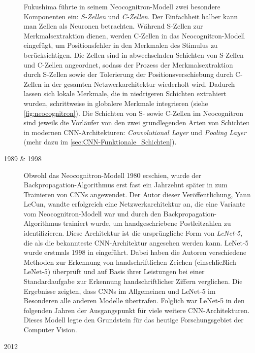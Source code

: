 \begin{description}
	Fukushima führte in seinem Neocognitron-Modell zwei besondere Komponenten ein: \emph{S-Zellen} und \emph{C-Zellen}. Der Einfachheit halber kann man Zellen als Neuronen betrachten. Während S-Zellen zur Merkmalsextraktion dienen, werden C-Zellen in das Neocognitron-Modell eingefügt, um Positionsfehler in den Merkmalen des Stimulus zu berücksichtigen. Die Zellen sind in abwechselnden Schichten von S-Zellen und C-Zellen angeordnet, sodass der Prozess der Merkmalsextraktion durch S-Zellen sowie der Tolerierung der Positionsverschiebung durch C-Zellen in der gesamten Netzwerkarchitektur wiederholt wird. Dadurch lassen sich lokale Merkmale, die in niedrigeren Schichten extrahiert wurden, schrittweise in globalere Merkmale integrieren (siehe \autoref{fig:neocognitron}). Die Schichten von S- sowie C-Zellen im Neocognitron sind jeweils die Vorläufer von den zwei grundlegenden Arten von Schichten in modernen CNN-Architekturen: \emph{Convolutional Layer} und \emph{Pooling Layer} (mehr dazu im \autoref{sec:CNN-Funktionale_Schichten}).
	
	\item[1989 \& 1998]
	
	Obwohl das Neocognitron-Modell 1980 erschien, wurde der Backpropagation-Algorithmus erst fast ein Jahrzehnt später in \cite{yannlecun1989} zum Trainieren von CNNs angewendet. Der Autor dieser Veröffentlichung, Yann LeCun, wandte erfolgreich eine Netzwerkarchitektur an, die eine Variante vom Neocognitron-Modell war und durch den Backpropagation-Algorithmus trainiert wurde, um handgeschriebene Postleitzahlen zu identifizieren. Diese Architektur ist die ursprüngliche Form von \emph{LeNet-5}, die als die bekannteste CNN-Architektur angesehen werden kann. LeNet-5 wurde erstmals 1998 in \cite{yannlecun1998} eingeführt. Dabei haben die Autoren verschiedene Methoden zur Erkennung von handschriftlichen Zeichen (einschließlich LeNet-5) überprüft und auf Basis ihrer Leistungen bei einer Standardaufgabe zur Erkennung handschriftlicher Ziffern verglichen. Die Ergebnisse zeigten, dass CNNs im Allgemeinen und LeNet-5 im Besonderen alle anderen Modelle übertrafen. Folglich war LeNet-5 in den folgenden Jahren der Ausgangspunkt für viele weitere CNN-Architekturen. Dieses Modell legte den Grundstein für das heutige Forschungsgebiet der Computer Vision.
	
	\item[2012]
	

\end{description}
